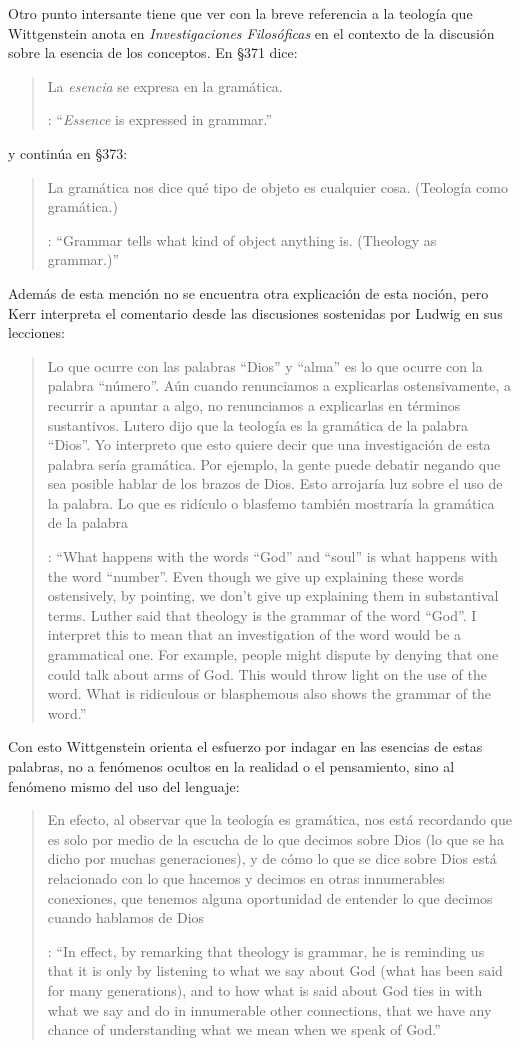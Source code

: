Otro punto intersante tiene que ver con la breve referencia a la teología que Wittgenstein anota en \emph{Investigaciones Filosóficas} en el contexto de la discusión sobre la esencia de los conceptos. En \S371 dice: \blockquote[{\cite[\S371]{wittgenstein1953phiinv}}: \enquote{\emph{Essence} is expressed in grammar.}]{La \emph{esencia} se expresa en la gramática.} y continúa en \S373: \blockquote[{\cite[\S371]{wittgenstein1953phiinv}}: \enquote{Grammar tells what kind of object anything is. (Theology as grammar.)}]{La gramática nos dice qué tipo de objeto es cualquier cosa. (Teología como gramática.)} Además de esta mención no se encuentra otra explicación de esta noción, pero Kerr interpreta el comentario desde las discusiones sostenidas por Ludwig en sus lecciones: \blockquote[{\cite[32]{ambrose2001lectures}}: \enquote{What happens with the words ``God'' and ``soul'' is what happens with the word ``number''. Even though we give up explaining these words ostensively, by pointing, we don't give up explaining them in substantival terms. \textelp{} Luther said that theology is the grammar of the word ``God''. I interpret this to mean that an investigation of the word would be a grammatical one. For example, people might dispute by denying that one could talk about arms of God. This would throw light on the use of the word. What is ridiculous or blasphemous also shows the grammar of the word.}]{Lo que ocurre con las palabras ``Dios'' y ``alma'' es lo que ocurre con la palabra ``número''. Aún cuando renunciamos a explicarlas ostensivamente, a recurrir a apuntar a algo, no renunciamos a explicarlas en términos sustantivos. \textelp{} Lutero dijo que la teología es la gramática de la palabra ``Dios''. Yo interpreto que esto quiere decir que una investigación de esta palabra sería gramática. Por ejemplo, la gente puede debatir negando que sea posible hablar de los brazos de Dios. Esto arrojaría luz sobre el uso de la palabra. Lo que es ridículo o blasfemo también mostraría la gramática de la palabra}. Con esto Wittgenstein orienta el esfuerzo por indagar en las esencias de estas palabras, no a fenómenos ocultos en la realidad o el pensamiento, sino al fenómeno mismo del uso del lenguaje: \blockquote[{\cite[148-149]{kerr1997theo}}: \enquote{In effect, by remarking that theology is grammar, he is reminding us that it is only by listening to what we say about God (what has been said for many generations), and to how what is said about God ties in with what we say and do in innumerable other connections, that we have any chance of understanding what we mean when we speak of God.}]{En efecto, al observar que la teología es gramática, nos está recordando que es solo por medio de la escucha de lo que decimos sobre Dios (lo que se ha dicho por muchas generaciones), y de cómo lo que se dice sobre Dios está relacionado con lo que hacemos y decimos en otras innumerables conexiones, que tenemos alguna oportunidad de entender lo que decimos cuando hablamos de Dios}.
